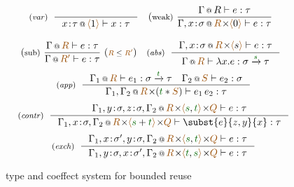 \begin{figure}[t]
\vspace{-0.5em}
\begin{align*}
\begin{array}{c}
%
\hspace{-0.6em}
\begin{array}{c}
\tyrule{var}{}
  {\coctx{x \!:\! \tau}{\alift{1}} \vdash x : \tau} 
\quad 
\tyruleCompact{weak}
  {\coctx{\Gamma}{R} \vdash e : \tau}
  {\coctx{\Gamma,x \!:\! \sigma}{\aclrd{R} \cons \alift{0}} \vdash e : \tau} 
\\[1.8em]
\tyruleCompact{sub}
  {\coctx{\Gamma}{\aclrd{R}} \vdash e : \tau}
  {\coctx{\Gamma}{\aclrd{R'}} \vdash e : \tau}~(\text{\scriptsize $\aclrd{R} \leq \aclrd{R'}$})
\quad 
\tyrule{abs}
  {\coctx{\Gamma, x \!:\! \sigma}{\aclrd{R} \cons \alift{s}} \vdash e : \tau}
  {\coctx{\Gamma}{\aclrd{R}} \vdash \lambda x . e : \sigma \xrightarrow{\cclrd{s}} \tau} 
\\[1.2em]
\end{array} \\
%
%
\begin{array}{c}
\tyrule{app}
  { \coctx{\Gamma_1}{\aclrd{R}} \vdash e_1 : \sigma \xrightarrow{\cclrd{t}} \tau \quad 
    \coctx{\Gamma_2}{\aclrd{S}} \vdash e_2 : \sigma}
  { \coctx{\Gamma_1, \Gamma_2}{\aclrd{R} \cons (\cclrd{t} \ast \aclrd{S})} \vdash e_1 \, e_2 : \tau} 
\\[1.3em]
\tyrule{contr}
  {\coctx{\Gamma_1,y\!:\!\sigma,z\!:\!\sigma,\Gamma_2}{\aclrd{R}\cons \alift{\cclrd{s},\cclrd{t}} \cons \aclrd{Q}} \vdash e : \tau}
  {\coctx{\Gamma_1,x\!:\!\sigma,\Gamma_2}{\aclrd{R}\cons\alift{\cclrd{s}+\cclrd{t}} \cons \aclrd{Q}} \vdash \subst{e}{z,y}{x} : \tau}
\\[1.3em]
\tyrule{exch}
  {\coctx{\Gamma_1,x\!:\!\sigma',y\!:\!\sigma,\Gamma_2}{\aclrd{R}\cons\alift{\cclrd{s},\cclrd{t}} \cons \aclrd{Q}} \vdash e : \tau}
  {\coctx{\Gamma_1,y\!:\!\sigma,x\!:\!\sigma',\Gamma_2}{\aclrd{R}\cons\alift{\cclrd{t},\cclrd{s}} \cons \aclrd{Q}} \vdash e : \tau}
\end{array} 
%
%
%
%
\end{array}
\end{align*}
\vspace{-0.5em}
\caption{type and coeffect system for bounded reuse}
\label{fig:bounded-coeff}
\end{figure}


